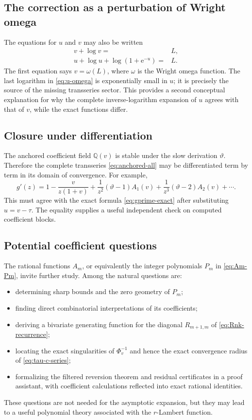 \documentclass[11pt,oneside]{article}
\theoremstyle{plain}
\theoremstyle{definition}
\theoremstyle{remark}
\newcommand{\e}{\mathrm{e}}
\newcommand{\Q}{\mathbb{Q}}
\begin{document}
\subsection{The correction as a perturbation of Wright omega}

The equations for \(u\) and \(v\) may also be written
\begin{align}
 v+\log v={}&L,\label{eq:v-omega}\\
 u+\log u+\log(1+\e^{-u})={}&L.
 \label{eq:u-omega}
\end{align}
The first equation says \(v=\omega(L)\), where \(\omega\) is the Wright omega
function.  The last logarithm in \eqref{eq:u-omega} is exponentially small in
\(u\); it is precisely the source of the missing transseries sector.  This
provides a second conceptual explanation for why the complete inverse-logarithm
expansion of \(u\) agrees with that of \(v\), while the exact functions differ.

\subsection{Closure under differentiation}

The anchored coefficient field \(\Q(v)\) is stable under the slow derivation
\(\vartheta\).  Therefore the complete transseries
\eqref{eq:anchored-all} may be differentiated term by term in its domain of
convergence.  For example,
\begin{equation}
 g'(z)=1-\frac{v}{z(1+v)}
 +\frac1{z^2}(\vartheta-1)A_1(v)
 +\frac1{z^3}(\vartheta-2)A_2(v)+\cdots.
 \label{eq:gprime-series}
\end{equation}
This must agree with the exact formula \eqref{eq:gprime-exact} after substituting
\(u=v-\tau\).  The equality supplies a useful independent check on computed
coefficient blocks.

\subsection{Potential coefficient questions}

The rational functions \(A_m\), or equivalently the integer polynomials
\(P_m\) in \eqref{eq:Am-Pm}, invite further study.  Among the natural questions
are:
\begin{itemize}
\item determining sharp bounds and the zero geometry of \(P_m\);
\item finding direct combinatorial interpretations of its coefficients;
\item deriving a bivariate generating function for the diagonal
      \(R_{m+1,m}\) of \eqref{eq:Rnk-recurrence};
\item locating the exact singularities of \(\Phi_v^{-1}\) and hence the exact
      convergence radius of \eqref{eq:tau-c-series};
\item formalizing the filtered reversion theorem and residual certificates in
      a proof assistant, with coefficient calculations reflected into exact
      rational identities.
\end{itemize}
These questions are not needed for the asymptotic expansion, but they may lead
to a useful polynomial theory associated with the \(r\)-Lambert function.
\end{document}
